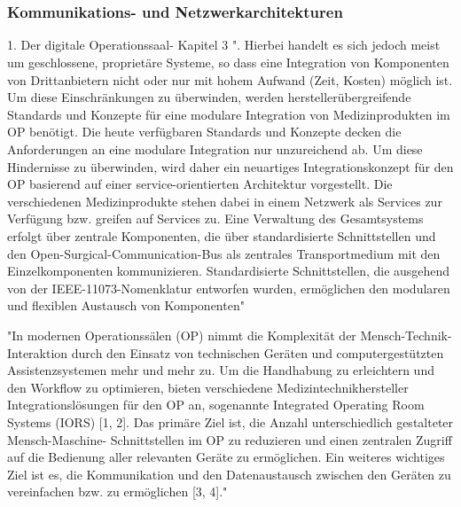\chapter{}
\label{sec:overview}

\subsection{Kommunikations- und Netzwerkarchitekturen}
1. Der digitale Operationssaal- Kapitel 3
	". Hierbei handelt es sich jedoch meist um geschlossene,
	proprietäre Systeme, so dass eine Integration von Komponenten von Drittanbietern
	nicht oder nur mit hohem Aufwand (Zeit, Kosten) möglich ist. Um diese Einschränkungen
	zu überwinden, werden herstellerübergreifende Standards und Konzepte für
	eine modulare Integration von Medizinprodukten im OP benötigt. Die heute verfügbaren
	Standards und Konzepte decken die Anforderungen an eine modulare Integration
	nur unzureichend ab. Um diese Hindernisse zu überwinden, wird daher ein
	neuartiges Integrationskonzept für den OP basierend auf einer service-orientierten
	Architektur vorgestellt.
	Die verschiedenen Medizinprodukte stehen dabei in einem Netzwerk als Services
	zur Verfügung bzw. greifen auf Services zu. Eine Verwaltung des Gesamtsystems
	erfolgt über zentrale Komponenten, die über standardisierte Schnittstellen und den
	Open-Surgical-Communication-Bus als zentrales Transportmedium mit den Einzelkomponenten
	kommunizieren. Standardisierte Schnittstellen, die ausgehend von der
	IEEE-11073-Nomenklatur entworfen wurden, ermöglichen den modularen und flexiblen
	Austausch von Komponenten"
	
	"In modernen Operationssälen (OP) nimmt die Komplexität der Mensch-Technik-
	Interaktion durch den Einsatz von technischen Geräten und computergestützten
	Assistenzsystemen mehr und mehr zu. Um die Handhabung zu erleichtern und den
	Workflow zu optimieren, bieten verschiedene Medizintechnikhersteller Integrationslösungen
	für den OP an, sogenannte Integrated Operating Room Systems (IORS)
	[1, 2]. Das primäre Ziel ist, die Anzahl unterschiedlich gestalteter Mensch-Maschine-
	Schnittstellen im OP zu reduzieren und einen zentralen Zugriff auf die Bedienung
	aller relevanten Geräte zu ermöglichen.
	Ein weiteres wichtiges Ziel ist es, die Kommunikation und den Datenaustausch
	zwischen den Geräten zu vereinfachen bzw. zu ermöglichen [3, 4]."
	
